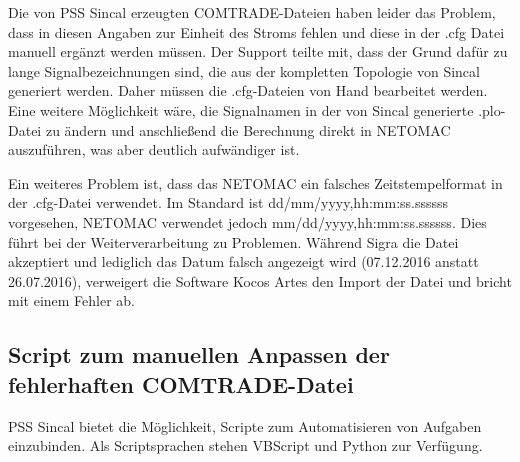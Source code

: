 \documentclass{scrartcl}
\begin{document}
\begin{onehalfspace}
Die von PSS Sincal erzeugten COMTRADE-Dateien haben leider das Problem, dass in diesen Angaben zur Einheit des Stroms fehlen und diese in der .cfg Datei manuell ergänzt werden müssen. Der Support teilte mit, dass der Grund dafür zu lange Signalbezeichnungen sind, die aus der kompletten Topologie von Sincal generiert werden. Daher müssen die .cfg-Dateien von Hand bearbeitet werden. Eine weitere Möglichkeit wäre, die Signalnamen in der von Sincal generierte .plo-Datei zu ändern und anschließend die Berechnung direkt in NETOMAC auszuführen, was aber deutlich aufwändiger ist.

Ein weiteres Problem ist, dass das NETOMAC ein falsches Zeitstempelformat in der .cfg-Datei verwendet. Im Standard ist dd/mm/yyyy,hh:mm:ss.ssssss vorgesehen, NETOMAC verwendet jedoch mm/dd/yyyy,hh:mm:ss.ssssss. Dies führt bei der Weiterverarbeitung zu Problemen. Während Sigra die Datei akzeptiert und lediglich das Datum falsch angezeigt wird (07.12.2016 anstatt 26.07.2016), verweigert die Software Kocos Artes den Import der Datei und bricht mit einem Fehler ab.

\subsection{Script zum manuellen Anpassen der fehlerhaften COMTRADE-Datei}
PSS Sincal bietet die Möglichkeit, Scripte zum Automatisieren von Aufgaben einzubinden. Als Scriptsprachen stehen VBScript und Python zur Verfügung.


\end{onehalfspace}
\end{document}
